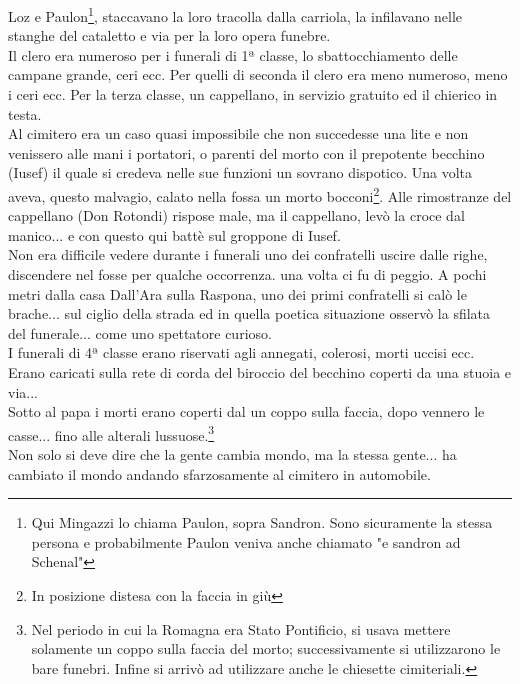 \documentclass[10pt]{memoir} %
\begin{document}
Loz e Paulon\footnote{Qui Mingazzi lo chiama Paulon, sopra Sandron. Sono sicuramente la stessa persona e probabilmente Paulon veniva anche chiamato "e sandron ad Schenal"}, staccavano la loro tracolla dalla carriola, la infilavano nelle stanghe del cataletto e via per la loro opera funebre.\\
Il clero era numeroso per i funerali di 1ª classe, lo sbattocchiamento delle campane grande, ceri ecc. Per quelli di seconda il clero era meno numeroso, meno i ceri ecc. Per la terza classe, un cappellano, in servizio gratuito ed il chierico in testa.\\
Al cimitero era un caso quasi impossibile che non succedesse una lite e non venissero alle mani i portatori, o parenti del morto con il prepotente becchino (Iusef) il quale si credeva nelle sue funzioni un sovrano dispotico. Una volta aveva, questo malvagio, calato nella fossa un morto bocconi\footnote{In posizione distesa con la faccia in giù}. Alle rimostranze del cappellano (Don Rotondi) rispose male, ma il cappellano, levò la croce dal manico... e con questo qui battè sul groppone di Iusef.\\
Non era difficile vedere durante i funerali uno dei confratelli uscire dalle righe, discendere nel fosse per qualche occorrenza. una volta ci fu di peggio. A pochi metri dalla casa Dall'Ara sulla  Raspona, uno dei primi confratelli si calò le brache... sul ciglio della strada ed in quella poetica situazione osservò la sfilata del funerale... come uno spettatore curioso.\\
I funerali di 4ª classe erano riservati agli annegati, colerosi, morti uccisi ecc. Erano caricati sulla rete di corda del biroccio del becchino coperti da una stuoia e via...\\
Sotto al papa i morti erano coperti dal un coppo sulla faccia, dopo vennero le casse... fino alle alterali lussuose.\footnote{Nel periodo in cui la Romagna era Stato Pontificio, si usava mettere solamente un coppo sulla faccia del morto; successivamente si utilizzarono le bare funebri. Infine si arrivò ad utilizzare anche le chiesette cimiteriali.}\\
Non solo si deve dire che la gente cambia mondo, ma la stessa gente... ha cambiato il mondo andando sfarzosamente al cimitero in automobile. 

\end{document}
